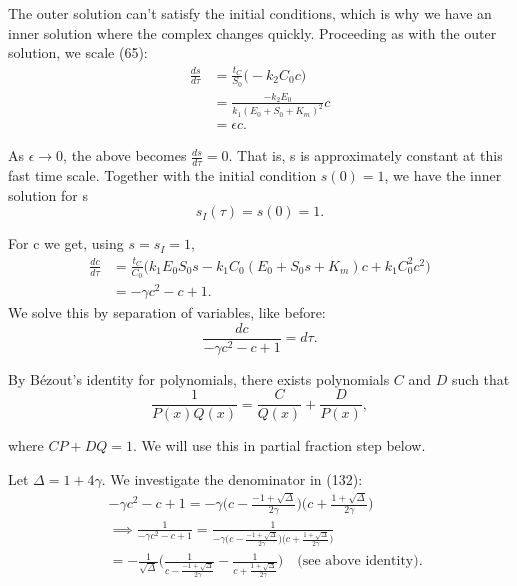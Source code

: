 \documentclass[12pt]{article}
\begin{document}
The outer solution can't satisfy the initial conditions, which is why
we have an inner solution where the complex changes
quickly. Proceeding as with the outer solution, we scale (65):
\begin{align}
\frac{ds}{d\tau} &= \frac{t_C}{S_0} \Big( - k_2 C_0 c \Big) \\
                 &= \frac{-k_2 E_0}{k_1(E_0 + S_0 + K_m)^2} c \\
                 &= \epsilon c.
\end{align}

As $\epsilon \to 0$, the above becomes $\frac{ds}{d\tau} = 0$. That
is, s is approximately constant at this fast time scale. Together with
the initial condition $s(0)=1$, we have the inner solution for s
\begin{equation}
s_I(\tau) = s(0) = 1.
\end{equation}

For c we get, using $s= s_I = 1$,
\begin{align}
\frac{dc}{d\tau} &= \frac{t_C}{C_0} \Big(
                     k_1 E_0 S_0 s - k_1 C_0 (E_0 + S_0 s + K_m) c + k_1 C_0^2 c^2
                     \Big) \\
                 & = - \gamma c^2 - c + 1.
\end{align}
We solve this by separation of variables, like before:
\begin{equation}
\frac{dc}{- \gamma c^2 - c + 1} = d\tau.
\end{equation}

By B\'{e}zout's identity for polynomials, there exists polynomials $C$
and $D$ such that
\begin{equation}
\frac{1}{P(x) Q(x)} = \frac{C}{Q(x)} + \frac{D}{P(x)},
\end{equation}

where $CP+DQ = 1$. We will use this in partial fraction step below.

Let $\Delta=1 + 4\gamma$. We investigate the denominator in (132):
\begin{align}
&-\gamma c^2 - c + 1 = - \gamma
                        \Big(c - \frac{-1 + \sqrt{\Delta}}{2 \gamma}\Big)
                        \Big(c + \frac{ 1 + \sqrt{\Delta}}{2 \gamma}\Big) \\
&\implies \frac{1}{- \gamma c^2 - c + 1} = \frac{1}
                        {- \gamma
                        \Big(c - \frac{-1 + \sqrt{\Delta}}{2 \gamma}\Big)
                        \Big(c + \frac{ 1 + \sqrt{\Delta}}{2 \gamma}\Big)} \\
&= - \frac{1}{\sqrt{\Delta}}
   \Bigg(\frac{1}{c - \frac{-1 + \sqrt{\Delta}}{2 \gamma}} -
        \frac{1}{c + \frac{1 + \sqrt{\Delta}}{2 \gamma}} \Bigg)
   \quad \text{(see above identity)}.
\end{align}
\end{document}
